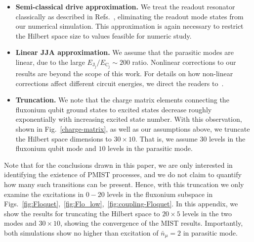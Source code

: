 \documentclass[%
reprint,
superscriptaddress,
 amsmath,amssymb,
 aps,
 prx,
longbibliography,
floatfix,
]{revtex4-2}
\begin{document}
{\begin{itemize}
    \item \textbf{Semi-classical drive approximation.}  We treat the readout resonator classically as described in Refs.~\cite{xiao2023diagrammatic,dumas2024unified,cohen2023reminiscence,khezri2023measurement}, eliminating the readout mode states from our numerical simulation. This approximation is again necessary to restrict the Hilbert space size to values feasible for numeric study.
    
    \item \textbf{Linear JJA approximation.} We assume that the parasitic modes are linear, due to the large $E_{\textrm{J}_\textrm{j}}/E_{\textrm{C}_\textrm{j}} \sim 200$ ratio. Nonlinear corrections to our results are beyond the scope of this work. For details on how non-linear corrections affect different circuit energies, we direct the readers to~\cite{viola2015collective}. 
    \item \textbf{Truncation.} We note that the charge matrix elements connecting the fluxonium qubit ground states to excited states decrease roughly exponentially with increasing excited state number. With this observation, shown in Fig.~\ref{charge-matrix}, as well as our assumptions above, we truncate the Hilbert space dimensions to $30\times 10$. That is, we assume $30$ levels in the fluxonium qubit mode and $10$ levels in the parasitic mode. 
    \end{itemize}
    Note that for the conclusions drawn in this paper, we are only interested in identifying the existence of PMIST processes, and we do not claim to quantify how many such transitions can be present. Hence, with this truncation we only examine the excitations in $0-20$ levels in the fluxonium subspace in Figs.~\ref{fig:Floquet},~\ref{fig:Flo_low},~\ref{fig:coupling-Floquet}. In this appendix, we show the results for truncating the Hilbert space to $20
    \times 5$ levels in the two modes and $30
    \times 10$, showing the convergence of the MIST results. Importantly, both simulations show no higher than excitation of $\bar n_\mu=2$ in parasitic mode.

}
\end{document}
